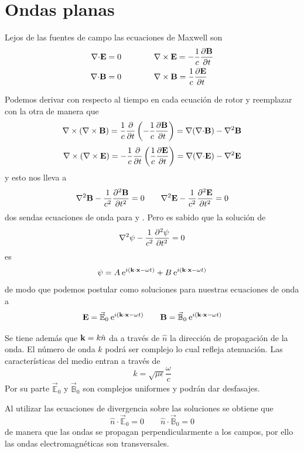 \documentclass[10pt,oneside]{CBFT_book}
\begin{document}
\chapter{Ondas planas}

Lejos de las fuentes de campo las ecuaciones de Maxwell son
\begin{align*}
	\divem{E} = 0 \qquad \qquad &\rotorm{E} = -\frac{1}{c}\dpar{\vb{B}}{t} \\
	\divem{B} = 0 \qquad \qquad &\rotorm{B} = \frac{1}{c}\dpar{\vb{E}}{t}
\end{align*}

Podemos derivar con respecto al tiempo en cada ecuación de rotor y reemplazar con la otra
de manera que
\[
	\rotorm{(\rotorm{B})} = \frac{1}{c}\dpar{}{t}\left(-\frac{1}{c}\dpar{\vb{B}}{t} \right)
	= \Nabla(\divem{B}) - \nabla^2 \vb{B}
\]
\[
	\rotorm{(\rotorm{E})} = -\frac{1}{c}\dpar{}{t}\left(\frac{1}{c}\dpar{\vb{E}}{t} \right)
	= \Nabla(\divem{E}) - \nabla^2 \vb{E}
\]
y esto nos lleva a 
\[
	\nabla^2 \vb{B} - \frac{1}{c^2}\dpar[2]{\vb{B}}{t} = 0 \qquad 
	\nabla^2 \vb{E} - \frac{1}{c^2}\dpar[2]{\vb{E}}{t} = 0
\]
dos sendas ecuaciones de onda para  y . Pero es sabido que la solución de
\[
	\nabla^2 \psi - \frac{1}{c^2} \dpar[2]{\psi}{t} = 0
\]
es
\[
	\psi = A\euler^{i(\pe{k}{x}-\omega t)} + B\euler^{i(\pe{k}{x}-\omega t)}
\]
de modo que podemos postular como soluciones para nuestras ecuaciones de onda a
\[
	\vb{E} = \vec{\mathbb{E}}_0 \euler^{i(\pe{k}{x}-\omega t)} \qquad 
	\vb{B} = \vec{\mathbb{B}}_0 \euler^{i(\pe{k}{x}-\omega t)}
\]

Se tiene además que $\vb{k} = k \hat{n}$ da a través de $\hat{n}$ la dirección de
propagación de la onda. El número de onda $k$ podrá ser complejo lo cual refleja
atenuación. Las características del medio entran a través de
\[
	k = \sqrt{\mu\epsilon} \frac{\omega}{c}
\]
Por su parte $\vec{\mathbb{E}}_0$ y $\vec{\mathbb{B}}_0$ son complejos uniformes y
podrán dar desfasajes.

Al utilizar las ecuaciones de divergencia sobre las soluciones se obtiene que 
\[
	\hat{n}\cdot \vec{\mathbb{E}}_0 = 0 \qquad \hat{n}\cdot \vec{\mathbb{B}}_0 = 0
\]
de manera que las ondas se propagan perpendicularmente a los campos, por ello las
ondas electromagnéticas son transversales.
\end{document}
